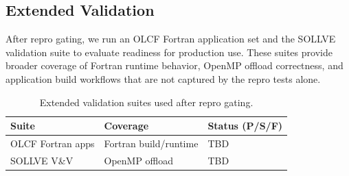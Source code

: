 \subsection{Extended Validation}
\label{sec:extended-validation}
After repro gating, we run an OLCF Fortran application set and the SOLLVE
validation suite to evaluate readiness for production use. These suites provide
broader coverage of Fortran runtime behavior, OpenMP offload correctness, and
application build workflows that are not captured by the repro tests alone.

\begin{table}[t]
  \centering
  \caption{Extended validation suites used after repro gating.}
  \label{tab:extended}
  \begin{tabular}{l l l}
    \hline
    Suite & Coverage & Status (P/S/F) \\
    \hline
    OLCF Fortran apps & Fortran build/runtime & TBD \\
    SOLLVE V\&V & OpenMP offload & TBD \\
    \hline
  \end{tabular}
\end{table}
